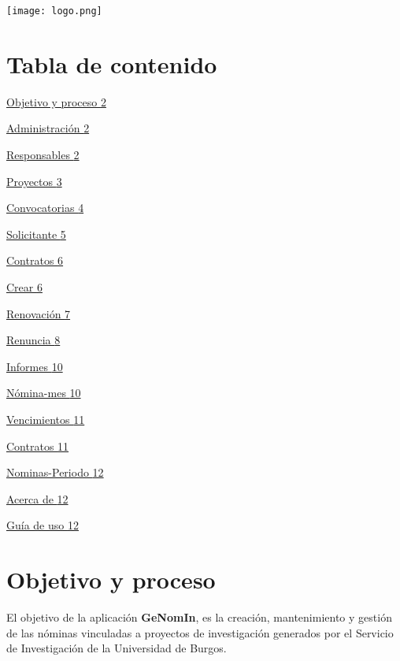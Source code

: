 \begin{center}
	\texttt{[image: logo.png]}
\end{center}

\section{Tabla de contenido}\label{tabla-de-contenido}
\hyperref[objetivo-y-proceso]{Objetivo y proceso
\hyperref[objetivo-y-proceso]{2}}

\hyperref[administraciuxf3n]{Administración
	\hyperref[administraciuxf3n]{2}}

\hyperref[responsables]{Responsables \hyperref[responsables]{2}}

\hyperref[proyectos]{Proyectos \hyperref[proyectos]{3}}

\hyperref[convocatorias]{Convocatorias \hyperref[convocatorias]{4}}

\hyperref[solicitante]{Solicitante \hyperref[solicitante]{5}}

\hyperref[contratos]{Contratos \hyperref[contratos]{6}}

\hyperref[crear]{Crear \hyperref[crear]{6}}

\hyperref[renovaciuxf3n]{Renovación \hyperref[renovaciuxf3n]{7}}

\hyperref[renuncia]{Renuncia \hyperref[renuncia]{8}}

\hyperref[informes]{Informes \hyperref[informes]{10}}

\hyperref[nuxf3mina-mes]{Nómina-mes \hyperref[nuxf3mina-mes]{10}}

\hyperref[vencimientos]{Vencimientos \hyperref[vencimientos]{11}}

\hyperref[contratos-1]{Contratos \hyperref[contratos-1]{11}}

\hyperref[nominas-periodo]{Nominas-Periodo
	\hyperref[nominas-periodo]{12}}

\hyperref[acerca-de]{Acerca de \hyperref[acerca-de]{12}}

\hyperref[guuxeda-de-uso]{Guía de uso \hyperref[guuxeda-de-uso]{12}}

\section{Objetivo y proceso}\label{objetivo-y-proceso}

El objetivo de la aplicación \textbf{GeNomIn}, es la creación,
mantenimiento y gestión de las nóminas vinculadas a proyectos de
investigación generados por el Servicio de Investigación de la
Universidad de Burgos.

